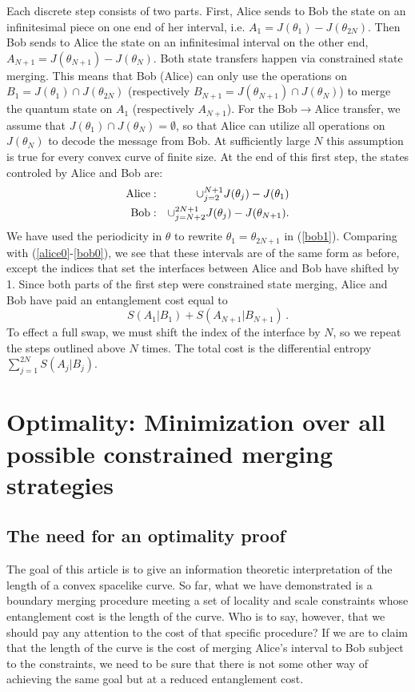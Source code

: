 \documentclass[12pt]{article}
\begin{document}
Each discrete step consists of two parts. First, Alice sends to Bob the state on an infinitesimal piece on one end of her interval, i.e. $A_1=J(\theta_1)-J(\theta_{2N})$. Then Bob sends to Alice the state on an infinitesimal interval on the other end, $A_{N+1}=J(\theta_{N+1})-J(\theta_N)$. Both state transfers happen via constrained state merging. This means that Bob (Alice) can only use the operations on $B_1=J(\theta_1)\cap J(\theta_{2N})$ (respectively $B_{N+1} = J(\theta_{N+1}) \cap J(\theta_N)$) to merge the quantum state on $A_1$ (respectively $A_{N+1}$). For the Bob$\to$Alice transfer, we assume that $J(\theta_1) \cap J(\theta_N) = \emptyset$, so that Alice can utilize all operations on $J(\theta_N)$ to decode the message from Bob. At sufficiently large $N$ this assumption is true for every convex curve of finite size. At the end of this first step, the states controled by Alice and Bob are:
\begin{eqnarray}
{\rm Alice:} & & \cup_{j = 2}^{N+1} J(\theta_j) - J(\theta_{1}) \label{alice1} \\
{\rm Bob:} & & \cup_{j = N+2}^{2N+1} J(\theta_j) - J(\theta_{N+1})\label{bob1}.
\end{eqnarray}
We have used the periodicity in $\theta$ to rewrite $\theta_1 = \theta_{2N+1}$ in (\ref{bob1}).
Comparing with (\ref{alice0}-\ref{bob0}), we see that these intervals are of the same form as before, except the indices that set the interfaces between Alice and Bob have shifted by 1. Since both parts of the first step were constrained state merging, Alice and Bob have paid an entanglement cost equal to
\begin{equation}
S(A_1 | B_1) + S(A_{N+1} | B_{N+1})\,.
\end{equation}
To effect a full swap, we must shift the index of the interface by $N$, so we repeat the steps outlined above $N$ times. The total cost is the differential entropy $\sum_{j=1}^{2N} S(A_j | B_j)$.

\section{Optimality: Minimization over all possible constrained merging strategies} \label{optimality}

\subsection{The need for an optimality proof}

The goal of this article is to give an information theoretic interpretation of the length of a convex spacelike curve. So far, what we have demonstrated is a boundary merging procedure meeting a set of locality and scale constraints whose entanglement cost is the length of the curve. Who is to say, however, that we should pay any attention to the cost of that specific procedure? If we are to claim that the length of the curve is the cost of merging Alice's interval to Bob subject to the constraints, we need to be sure that there is not some other way of achieving the same goal but at a reduced entanglement cost.
\end{document}
